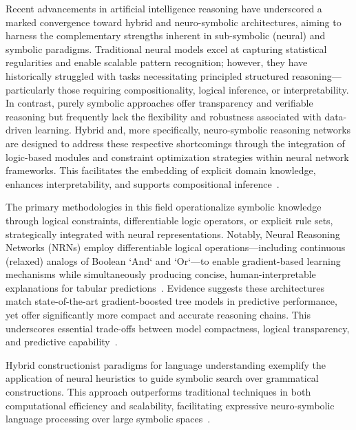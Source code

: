 \documentclass[11pt]{article}
\begin{document}
Recent advancements in artificial intelligence reasoning have underscored a marked convergence toward hybrid and neuro-symbolic architectures, aiming to harness the complementary strengths inherent in sub-symbolic (neural) and symbolic paradigms. Traditional neural models excel at capturing statistical regularities and enable scalable pattern recognition; however, they have historically struggled with tasks necessitating principled structured reasoning—particularly those requiring compositionality, logical inference, or interpretability. In contrast, purely symbolic approaches offer transparency and verifiable reasoning but frequently lack the flexibility and robustness associated with data-driven learning. Hybrid and, more specifically, neuro-symbolic reasoning networks are designed to address these respective shortcomings through the integration of logic-based modules and constraint optimization strategies within neural network frameworks. This facilitates the embedding of explicit domain knowledge, enhances interpretability, and supports compositional inference~\cite{reference93,reference1,reference10,reference11,reference22,reference42,reference45,reference49,reference54,reference56,reference68,reference86}.

The primary methodologies in this field operationalize symbolic knowledge through logical constraints, differentiable logic operators, or explicit rule sets, strategically integrated with neural representations. Notably, Neural Reasoning Networks (NRNs) employ differentiable logical operations—including continuous (relaxed) analogs of Boolean `And` and `Or`—to enable gradient-based learning mechanisms while simultaneously producing concise, human-interpretable explanations for tabular predictions~\cite{reference93}. Evidence suggests these architectures match state-of-the-art gradient-boosted tree models in predictive performance, yet offer significantly more compact and accurate reasoning chains. This underscores essential trade-offs between model compactness, logical transparency, and predictive capability~\cite{reference93,reference49}.

Hybrid constructionist paradigms for language understanding exemplify the application of neural heuristics to guide symbolic search over grammatical constructions. This approach outperforms traditional techniques in both computational efficiency and scalability, facilitating expressive neuro-symbolic language processing over large symbolic spaces~\cite{reference54}.
\end{document}
